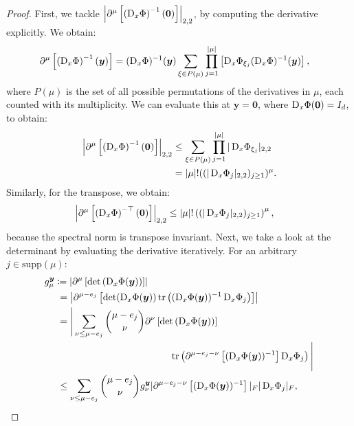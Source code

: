 \begin{proof}
    First, we tackle $\left| \partial^\mu \left[ \left( \mathop{}\!\mathrm{D}_x \Phi \right)^{-1}(\bm{0})\right]\right|_{2,2}$, by computing the derivative explicitly.
    We obtain:
    \begin{align*}
        \partial^\mu \left[ \left( \mathop{}\!\mathrm{D}_x \Phi \right)^{-1}(\bm{y})\right] &= (\mathop{}\!\mathrm{D}_x \Phi)^{-1}({\bm{y}}) \sum_{\xi\in P(\mu)} \prod_{j=1}^{|\mu|}\left[ \mathop{}\!\mathrm{D}_x \Phi_{\xi_j} (\mathop{}\!\mathrm{D}_x \Phi)^{-1}({\bm{y}}) \right],
    \end{align*}
    where $P(\mu)$ is the set of all possible permutations of the derivatives in $\mu$, each counted with its multiplicity.
    We can evaluate this at $\bm{y}=\bm{0}$, where $\mathop{}\!\mathrm{D}_x\Phi(\bm{0})=I_d$,  to obtain:
    \begin{align}
        \left| \partial^\mu \left[ \left( \mathop{}\!\mathrm{D}_x \Phi \right)^{-1}(\bm{0})\right]\right|_{2,2} &\leq  \sum_{\xi\in P(\mu)} \prod_{j=1}^{|\mu|} |\mathop{}\!\mathrm{D}_x \Phi_{\xi_j} |_{2,2}\\
        &=  \left|\mu\right|! ((|\mathop{}\!\mathrm{D}_x \Phi_j |_{2,2})_{j \geq 1}) ^{\mu}.\label{eq:invbound}
    \end{align}
    Similarly, for the transpose, we obtain:
    \begin{align}
        \left| \partial^\mu \left[ \left( \mathop{}\!\mathrm{D}_x \Phi \right)^{-\top}(\bm{0})\right]\right|_{2,2} &\leq  \left|\mu\right|! \left((|\mathop{}\!\mathrm{D}_x \Phi_j |_{2,2})_{j \geq 1}\right) ^{\mu},\label{eq:invtranspbound}
    \end{align}
    because the spectral norm is transpose invariant.
    Next, we take a look at the determinant by evaluating the derivative iteratively.
    For an arbitrary $j \in \text{supp}(\mu)$:
    \begin{align*}
        g_\mu^{\bm{y}}&\coloneqq\left| \partial^\mu \left[ \det\left( \D \Phi(\y) \right)\right]\right| \\
        &\phantom{:}=\left| \partial^{\mu - e_j}\left[ \det(\D \Phi(\y)) \tr\left((\D\Phi(\y)) ^{-1}\D\Phi_j\right)\right]\right|\\
        &\phantom{:}=\Bigg| \sum_{\nu \leq \mu - e_j}  \binom{\mu - e_j }{ \nu}  \partial^{\nu} \left[ \det\left( \D \Phi(\y) \right)\right] \\&\qquad\qquad\qquad\qquad\qquad\qquad\tr\left( \partial^{\mu - e_j - \nu}\left[ (\D \Phi(\y))^{-1} \right] \D \Phi_j  \right)\Bigg|\\
        &\phantom{:}\leq \sum_{\nu \leq \mu - e_j}  \binom{\mu - e_j }{\nu}  g_\nu^{\bm{y}} | \partial^{\mu - e_j - \nu}\left[ (\D \Phi(\y))^{-1} \right]|_F | \D \Phi_j |_F,

\end{align*}
\end{proof}
